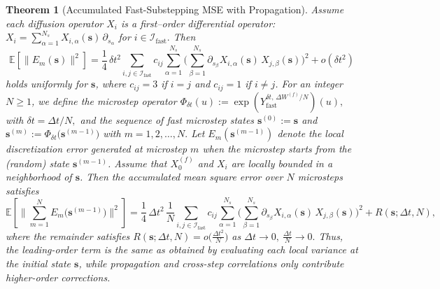 \documentclass{article}
\newtheorem{theorem}{Theorem}
\begin{document}
\begin{sloppypar}
\begin{theorem}[Accumulated Fast-Substepping MSE with Propagation]
\label{lem:fast_accum_propag}
Assume each diffusion operator \(X_i\) is a
first--order differential operator: 
$
X_i=\sum_{\alpha=1}^{N_s} X_{i,\alpha}(\pmb{s})\,\partial_{s_\alpha}$ for $i\in \mathcal I_{\mathrm{fast}}.$
Then
\[
\mathbb E\!\left[\|E_m(\pmb{s})\|^2\right]
=
\frac14\,\delta t^2
\sum_{i,j\in \mathcal{I}_{\mathrm{fast}}} c_{ij}
\sum_{\alpha=1}^{N_s}
\Bigg(
   \sum_{\beta=1}^{N_s}
      \partial_{s_\beta}X_{i,\alpha}(\pmb{s})\,X_{j,\beta}(\pmb{s})
\Bigg)^{\!2}
+ o(\delta t^2)
\]
holds uniformly for $\pmb{s}$, where $c_{ij}=3$ if $i=j$ and $c_{ij}=1$ if $i\neq j$. For an integer $N\ge 1$, we define the microstep operator
$
\Phi_{\delta t}(u)
:= \exp\!\left( 
     Y_{\mathrm{fast}}^{\delta t,\,\Delta W^{(f)}/N}
   \right)(u),$ with $
\delta t=\Delta t/N,$
and the sequence of fast microstep states
$
\pmb{s}^{(0)} := \pmb{s}$ and $
\pmb{s}^{(m)} := \Phi_{\delta t}\big(\pmb{s}^{(m-1)}\big)$ with $m=1,2,\dots,N.$
Let $E_m(\pmb{s}^{(m-1)})$ denote the local discretization error generated at
microstep $m$ when
the microstep starts from the (random) state $\pmb{s}^{(m-1)}$. Assume that $X_0^{(f)}$ and $X_i$ are locally bounded in a
neighborhood of $\pmb{s}$. 
Then the accumulated mean square error over $N$ microsteps satisfies
\[
\mathbb E\!\left[\Big\|\sum_{m=1}^N E_m\big(\pmb{s}^{(m-1)}\big)\Big\|^2\right]
=
\frac14\,\Delta t^2\,\frac{1}{N}
\sum_{i,j\in \mathcal{I}_{\mathrm{fast}}} c_{ij}
\sum_{\alpha=1}^{N_s}
\Bigg(
   \sum_{\beta=1}^{N_s}
      \partial_{s_\beta}X_{i,\alpha}(\pmb{s})\,X_{j,\beta}(\pmb{s})
\Bigg)^{\!2}
+ R(\pmb{s};\Delta t,N),
\]
where the remainder satisfies
\(
R(\pmb{s};\Delta t,N)
= o\!\Big(\frac{\Delta t^2}{N}\Big)
\) as \(\Delta t\to 0,\ \frac{\Delta t}{N}\to 0.
\)
Thus, the leading-order term is the same as obtained by evaluating each local
variance at the initial state $\pmb{s}$, while propagation and cross-step correlations
only contribute higher-order corrections.
\end{theorem}
\end{sloppypar}
\end{document}
